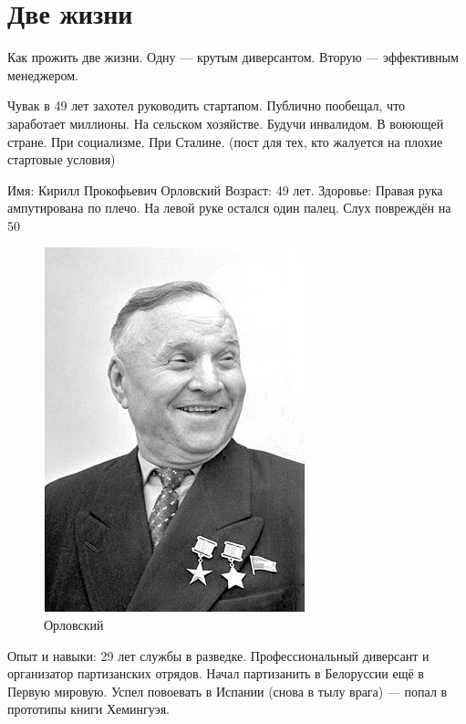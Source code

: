 
\chapter {Две жизни}

\begin{remark}
Как прожить две жизни. Одну — крутым диверсантом. Вторую — эффективным менеджером.
\end{remark}


Чувак в 49 лет захотел руководить стартапом. Публично пообещал, что заработает миллионы. На сельском хозяйстве. Будучи инвалидом.
В воюющей стране. При социализме. При Сталине.
(пост для тех, кто жалуется на плохие стартовые условия)

Имя: Кирилл Прокофьевич Орловский
Возраст: 49 лет.
Здоровье: Правая рука ампутирована по плечо. На левой руке остался один палец. Слух повреждён на 50%
\begin{figure}[h!tb] 
	\centering\includegraphics[scale=0.4]{Orlovskiy/TLiUJ3qpZuA.jpg}
	\caption{Орловский}%
\end{figure}
Опыт и навыки: 29 лет службы в разведке. Профессиональный диверсант и организатор партизанских отрядов. Начал партизанить в Белоруссии ещё в Первую мировую. Успел повоевать в Испании (снова в тылу врага) — попал в прототипы книги Хемингуэя.

